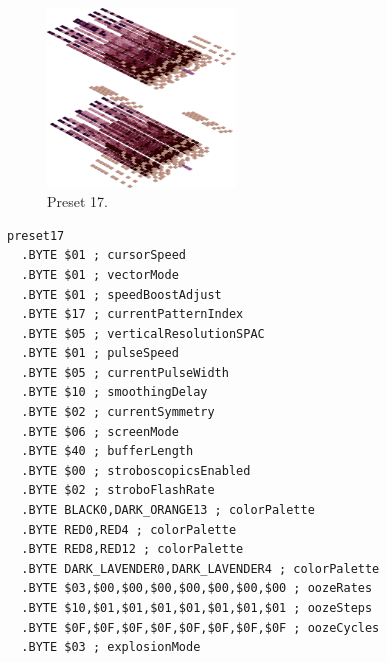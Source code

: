 \vspace*{0.5cm}
\begin{minipage}[b]{0.48\linewidth}
\begin{figure}[H]                                                          
  \centering                                                             
  \begin{adjustbox}{width=5cm,center}                                   
  \includegraphics[width=5cm]{src/colorspace_presets/preset17-45.png}%
  \end{adjustbox}                                                        
\caption*{Preset 17.}                                           
\end{figure}                                                               
\end{minipage}
\hspace{0.1cm}
\begin{minipage}[b]{0.48\linewidth}                                                                         
\begin{lstlisting}[basicstyle=\ttfamily\tiny]
preset17
  .BYTE $01 ; cursorSpeed
  .BYTE $01 ; vectorMode
  .BYTE $01 ; speedBoostAdjust
  .BYTE $17 ; currentPatternIndex
  .BYTE $05 ; verticalResolutionSPAC
  .BYTE $01 ; pulseSpeed
  .BYTE $05 ; currentPulseWidth
  .BYTE $10 ; smoothingDelay
  .BYTE $02 ; currentSymmetry
  .BYTE $06 ; screenMode
  .BYTE $40 ; bufferLength
  .BYTE $00 ; stroboscopicsEnabled
  .BYTE $02 ; stroboFlashRate
  .BYTE BLACK0,DARK_ORANGE13 ; colorPalette
  .BYTE RED0,RED4 ; colorPalette
  .BYTE RED8,RED12 ; colorPalette
  .BYTE DARK_LAVENDER0,DARK_LAVENDER4 ; colorPalette
  .BYTE $03,$00,$00,$00,$00,$00,$00,$00 ; oozeRates
  .BYTE $10,$01,$01,$01,$01,$01,$01,$01 ; oozeSteps
  .BYTE $0F,$0F,$0F,$0F,$0F,$0F,$0F,$0F ; oozeCycles
  .BYTE $03 ; explosionMode
\end{lstlisting}
\end{minipage}
\clearpage
